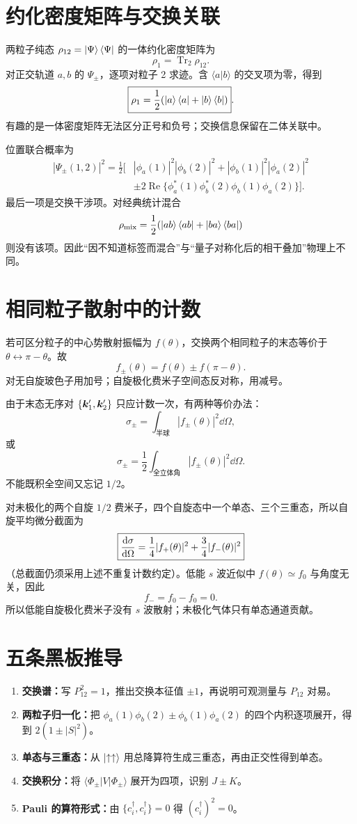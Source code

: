 \section{约化密度矩阵与交换关联}
两粒子纯态 $\rho_{12}=\left|\Psi\right\rangle\left\langle\Psi\right|$ 的一体约化密度矩阵为
\[
\rho_1=\operatorname{Tr}_2\rho_{12}.
\]
对正交轨道 $a,b$ 的 $\Psi_\pm$，逐项对粒子 2 求迹。含
$\langle a|b\rangle$ 的交叉项为零，得到
\[
\boxed{
\rho_1=\frac12(\left|a\right\rangle\left\langle a\right|+\left|b\right\rangle\left\langle b\right|)}.
\]
有趣的是一体密度矩阵无法区分正号和负号；交换信息保留在二体关联中。

位置联合概率为
\[
\begin{aligned}
|\Psi_\pm(1,2)|^2
=\frac12\big[&
|\phi_a(1)|^2|\phi_b(2)|^2
+|\phi_b(1)|^2|\phi_a(2)|^2\\
&\pm2\operatorname{Re}
\{\phi_a^*(1)\phi_b^*(2)\phi_b(1)\phi_a(2)\}\big].
\end{aligned}
\]
最后一项是交换干涉项。对经典统计混合
\[
\rho_{\rm mix}=\frac12(\left|ab\right\rangle\left\langle ab\right|+\left|ba\right\rangle\left\langle ba\right|)
\]
则没有该项。因此“因不知道标签而混合”与“量子对称化后的相干叠加”物理上不同。

\section{相同粒子散射中的计数}
\label{sec:identical-scattering-counting}
若可区分粒子的中心势散射振幅为 $f(\theta)$，交换两个相同粒子的末态等价于
$\theta\leftrightarrow\pi-\theta$。故
\[
\boxed{
f_\pm(\theta)=f(\theta)\pm f(\pi-\theta)}.
\]
对无自旋玻色子用加号；自旋极化费米子空间态反对称，用减号。

由于末态无序对 $\{\bm{k}_1',\bm{k}_2'\}$ 只应计数一次，有两种等价办法：
\[
\sigma_\pm=\int_{\text{半球}}|f_\pm(\theta)|^2\dd\Omega,
\]
或
\[
\boxed{
\sigma_\pm=\frac12\int_{\text{全立体角}}
|f_\pm(\theta)|^2\dd\Omega}.
\]
不能既积全空间又忘记 $1/2$。

对未极化的两个自旋 $1/2$ 费米子，四个自旋态中一个单态、三个三重态，所以自旋平均微分截面为
\[
\boxed{
\frac{\mathrm d \sigma}{\mathrm d \Omega}
=\frac14|f_+(\theta)|^2
+\frac34|f_-(\theta)|^2}
\]
（总截面仍须采用上述不重复计数约定）。低能 $s$ 波近似中
$f(\theta)\simeq f_0$ 与角度无关，因此
\[
f_-=f_0-f_0=0.
\]
所以低能自旋极化费米子没有 $s$ 波散射；未极化气体只有单态通道贡献。

\section{五条黑板推导}
\begin{enumerate}
\item \textbf{交换谱：}写 $P_{12}^2=1$，推出交换本征值 $\pm1$，再说明可观测量与 $P_{12}$ 对易。
\item \textbf{两粒子归一化：}把
$\phi_a(1)\phi_b(2)\pm\phi_b(1)\phi_a(2)$ 的四个内积逐项展开，得到
$2(1\pm|S|^2)$。
\item \textbf{单态与三重态：}从 $\left|\uparrow\uparrow\right\rangle$ 用总降算符生成三重态，再由正交性得到单态。
\item \textbf{交换积分：}将 $\langle\Phi_\pm|V|\Phi_\pm\rangle$ 展开为四项，识别 $J\pm K$。
\item \textbf{Pauli 的算符形式：}由
$\{c_i^\dagger,c_i^\dagger\}=0$ 得
$(c_i^\dagger)^2=0$。
\end{enumerate}

